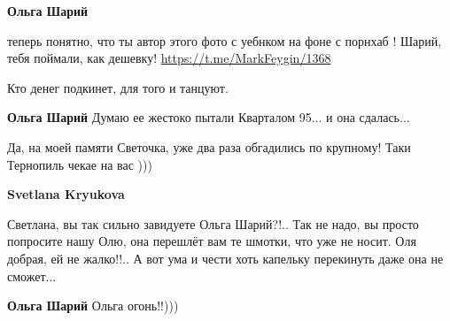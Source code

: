 \begin{itemize}
\begin{itemize}
\textbf{Ольга Шарий} 

теперь понятно, что ты автор этого фото с уебнком на фоне с порнхаб ! 
Шарий, тебя поймали, как дешевку! \url{https://t.me/MarkFeygin/1368}

 
Кто денег подкинет, для того и танцуют.

 
\textbf{Ольга Шарий} Думаю ее жестоко пытали Кварталом 95... и она сдалась...

 
Да, на моей памяти Светочка, уже два раза обгадились по крупному! Таки Тернопиль чекае на вас )))

 
\textbf{Svetlana Kryukova} 

Светлана, вы так сильно завидуете Ольга Шарий?!.. Так не надо, вы просто
попросите нашу Олю, она перешлёт вам те шмотки, что уже не носит. Оля добрая,
ей не жалко!!.. А вот ума и чести хоть капельку перекинуть даже она не
сможет...

 
\textbf{Ольга Шарий} Ольга огонь!!)))

 

\end{itemize}
\end{itemize}
